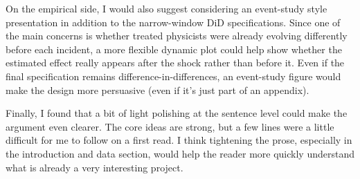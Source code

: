 \documentclass[12pt]{article}
\begin{document}
On the empirical side, I would also suggest considering an event-study style presentation in addition to the narrow-window DiD specifications. Since one of the main concerns is whether treated physicists were already evolving differently before each incident, a more flexible dynamic plot could help show whether the estimated effect really appears after the shock rather than before it. Even if the final specification remains difference-in-differences, an event-study figure would make the design more persuasive (even if it's just part of an appendix).

Finally, I found that a bit of light polishing at the sentence level could make the argument even clearer. The core ideas are strong, but a few lines were a little difficult for me to follow on a first read. I think tightening the prose, especially in the introduction and data section, would help the reader more quickly understand what is already a very interesting project.
\end{document}
